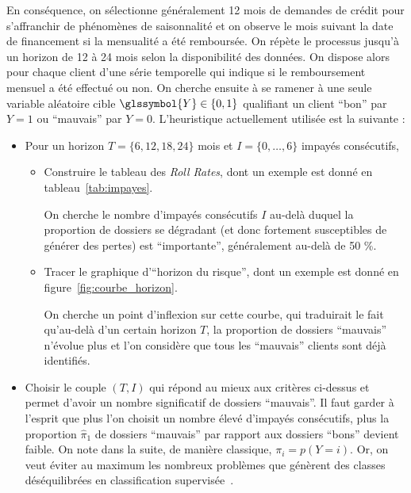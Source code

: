 En conséquence, on sélectionne généralement 12 mois de demandes de crédit pour s'affranchir de phénomènes de saisonnalité et on observe le mois suivant la date de financement si la mensualité a été remboursée. On répète le processus jusqu'à un horizon de 12 à 24 mois selon la disponibilité des données. On dispose alors pour chaque client d'une série temporelle qui indique si le remboursement mensuel a été effectué ou non. On cherche ensuite à se ramener à une seule variable aléatoire cible $\glssymbol{Y} \in \{0,1\}$ qualifiant un client ``bon'' par $Y=1$ ou ``mauvais'' par $Y=0$. L'heuristique actuellement utilisée est la suivante :
\begin{itemize}
\item Pour un horizon $T=\{6,12,18,24\}$ mois et $I = \{0,\dots,6\}$ impayés consécutifs,
\begin{itemize}
\item Construire le tableau des \textit{Roll Rates}, dont un exemple est donné en tableau~\ref{tab:impayes}.

On cherche le nombre d'impayés consécutifs $I$ au-delà duquel la proportion de dossiers se dégradant (et donc fortement susceptibles de générer des pertes) est ``importante'', généralement au-delà de 50 \%. 
\item Tracer le graphique d'``horizon du risque'', dont un exemple est donné en figure~\ref{fig:courbe_horizon}.

On cherche un point d'inflexion sur cette courbe, qui traduirait le fait qu'au-delà d'un certain horizon $T$, la proportion de dossiers ``mauvais'' n'évolue plus et l'on considère que tous les ``mauvais'' clients sont déjà identifiés.
\end{itemize}
\item Choisir le couple $(T,I)$ qui répond au mieux aux critères ci-dessus et permet d'avoir un nombre significatif de dossiers ``mauvais''. Il faut garder à l'esprit que plus l'on choisit un nombre élevé d'impayés consécutifs, plus la proportion $\hat{\pi}_1$ de dossiers ``mauvais'' par rapport aux dossiers ``bons'' devient faible. On note dans la suite, de manière classique, $\pi_i = p(Y=i)$. Or, on veut éviter au maximum les nombreux problèmes que génèrent des classes déséquilibrées en classification supervisée~\cite{sun2009classification}.
\end{itemize}

